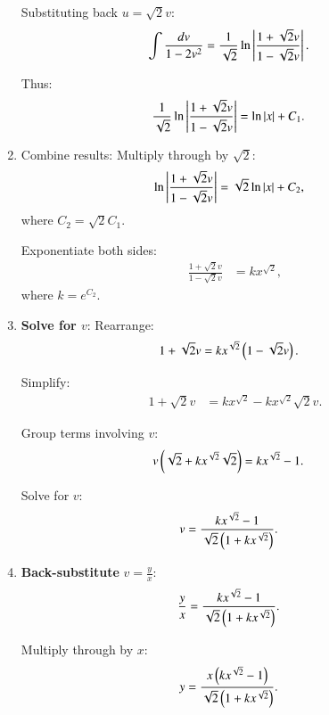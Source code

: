 \documentclass[journal]{IEEEtran}
\begin{document}
\begin{enumerate}
Substituting back $u = \sqrt{2}v$:
\begin{align}
\int \frac{dv}{1 - 2v^2} &= \frac{1}{\sqrt{2}} \ln \left\vert\frac{1 + \sqrt{2}v}{1 - \sqrt{2}v}\right\vert.
\end{align}

Thus:
\begin{align}
\frac{1}{\sqrt{2}} \ln \left\vert\frac{1 + \sqrt{2}v}{1 - \sqrt{2}v}\right\vert &= \ln\left\vert x\right\vert + C_1.
\end{align}

\item Combine results:  
Multiply through by $ \sqrt{2} $:
\begin{align}
\ln \left\vert\frac{1 + \sqrt{2}v}{1 - \sqrt{2}v}\right\vert &= \sqrt{2} \ln\left\vert x\right\vert + C_2,
\end{align}
where $C_2 = \sqrt{2}C_1$.

Exponentiate both sides:
\begin{align}
\frac{1 + \sqrt{2}v}{1 - \sqrt{2}v} &= k x^{\sqrt{2}},
\end{align}
where $k = e^{C_2}$.

\item \textbf{Solve for $v$}:  
Rearrange:
\begin{align}
1 + \sqrt{2}v &= k x^{\sqrt{2}} \left(1 - \sqrt{2}v\right).
\end{align}

Simplify:
\begin{align}
1 + \sqrt{2}v &= k x^{\sqrt{2}} - k x^{\sqrt{2}} \sqrt{2}v.
\end{align}

Group terms involving $v$:
\begin{align}
v \left(\sqrt{2} + k x^{\sqrt{2}} \sqrt{2}\right) &= k x^{\sqrt{2}} - 1.
\end{align}

Solve for $v$:
\begin{align}
v &= \frac{k x^{\sqrt{2}} - 1}{\sqrt{2} \left(1 + k x^{\sqrt{2}}\right)}.
\end{align}

\item \textbf{Back-substitute} $v = \frac{y}{x}$:  
\begin{align}
\frac{y}{x} &= \frac{k x^{\sqrt{2}} - 1}{\sqrt{2} \left(1 + k x^{\sqrt{2}}\right)}.
\end{align}

Multiply through by $x$:
\begin{align}
y &= \frac{x \left(k x^{\sqrt{2}} - 1\right)}{\sqrt{2} \left(1 + k x^{\sqrt{2}}\right)}.
\end{align}


\end{enumerate}
\end{document}
